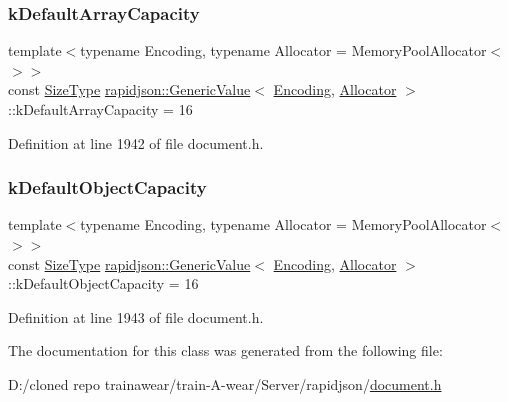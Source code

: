 \subsubsection{\texorpdfstring{kDefaultArrayCapacity}{kDefaultArrayCapacity}}
{\footnotesize\ttfamily template$<$typename Encoding, typename Allocator = Memory\+Pool\+Allocator$<$$>$$>$ \\
const \mbox{\hyperlink{namespacerapidjson_a44eb33eaa523e36d466b1ced64b85c84}{Size\+Type}} \mbox{\hyperlink{classrapidjson_1_1_generic_value}{rapidjson\+::\+Generic\+Value}}$<$ \mbox{\hyperlink{classrapidjson_1_1_encoding}{Encoding}}, \mbox{\hyperlink{classrapidjson_1_1_allocator}{Allocator}} $>$\+::k\+Default\+Array\+Capacity = 16\hspace{0.3cm}{\ttfamily [static]}}



Definition at line 1942 of file document.\+h.

\mbox{\label{classrapidjson_1_1_generic_value_ac2c66dad43986842f4a624f478de1741}} 
\subsubsection{\texorpdfstring{kDefaultObjectCapacity}{kDefaultObjectCapacity}}
{\footnotesize\ttfamily template$<$typename Encoding, typename Allocator = Memory\+Pool\+Allocator$<$$>$$>$ \\
const \mbox{\hyperlink{namespacerapidjson_a44eb33eaa523e36d466b1ced64b85c84}{Size\+Type}} \mbox{\hyperlink{classrapidjson_1_1_generic_value}{rapidjson\+::\+Generic\+Value}}$<$ \mbox{\hyperlink{classrapidjson_1_1_encoding}{Encoding}}, \mbox{\hyperlink{classrapidjson_1_1_allocator}{Allocator}} $>$\+::k\+Default\+Object\+Capacity = 16\hspace{0.3cm}{\ttfamily [static]}}



Definition at line 1943 of file document.\+h.



The documentation for this class was generated from the following file\+:\begin{DoxyCompactItemize}
\item 
D\+:/cloned repo trainawear/train-\/\+A-\/wear/\+Server/rapidjson/\mbox{\hyperlink{document_8h}{document.\+h}}\end{DoxyCompactItemize}
